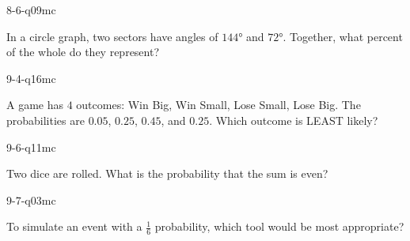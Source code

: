 \begin{practiceQuestion}{8-6-q09}{mc}
\begin{questionText}
In a circle graph, two sectors have angles of $144°$ and $72°$. Together, what percent of the whole do they represent?
\end{questionText}
\end{practiceQuestion}

\begin{practiceQuestion}{9-4-q16}{mc}
\begin{questionText}
A game has $4$ outcomes: Win Big, Win Small, Lose Small, Lose Big. The probabilities are $0.05$, $0.25$, $0.45$, and $0.25$. Which outcome is LEAST likely?
\end{questionText}
\end{practiceQuestion}

\begin{practiceQuestion}{9-6-q11}{mc}
\begin{questionText}
Two dice are rolled. What is the probability that the sum is even?
\end{questionText}
\end{practiceQuestion}

\begin{practiceQuestion}{9-7-q03}{mc}
\begin{questionText}
To simulate an event with a $\frac{1}{6}$ probability, which tool would be most appropriate?
\end{questionText}
\end{practiceQuestion}
